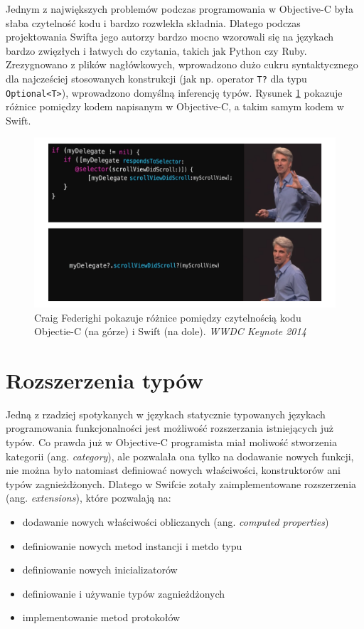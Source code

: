 \documentclass[mgr, shortabstract]{iithesis}
\newcommand{\ang}[1]{ang. \textit{#1}}
\begin{document}
Jednym z największych problemów podczas programowania w Objective-C była słaba czytelność kodu i bardzo rozwlekła składnia. Dlatego podczas projektowania Swifta jego autorzy bardzo mocno wzorowali się na językach bardzo zwięzłych i łatwych do czytania, takich jak Python czy Ruby. Zrezygnowano z plików nagłówkowych, wprowadzono dużo cukru syntaktycznego dla najcześciej stosowanych konstrukcji (jak np. operator \texttt{T?} dla typu \texttt{Optional<T>}), wprowadzono domyślną inferencję typów. Rysunek \ref{f:keynote} pokazuje różnice pomiędzy kodem napisanym w Objective-C, a takim samym kodem w Swift.

\begin{figure}[h!]
\includegraphics[width=\textwidth]{images/Keynote.png}
\caption{Craig Federighi pokazuje różnice pomiędzy czytelnością kodu Objectie-C (na górze) i Swift (na dole). \textit{WWDC Keynote 2014}}
\label{f:keynote}
\end{figure}

\section{Rozszerzenia typów}

Jedną z rzadziej spotykanych w językach statycznie typowanych językach programowania funkcjonalności jest możliwość rozszerzania istniejących już typów. Co prawda już w Objective-C programista miał moliwość stworzenia kategorii (\ang{category}), ale pozwalała ona tylko na dodawanie nowych funkcji, nie można było natomiast definiować nowych właściwości, konstruktorów ani typów zagnieżdżonych. Dlatego w Swifcie zotały zaimplementowane rozszerzenia (\ang{extensions}), które pozwalają na:

\begin{itemize}
    \item dodawanie nowych właściwości obliczanych (\ang{computed properties})
    \item definiowanie nowych metod instancji i metdo typu
    \item definiowanie nowych inicializatorów
    \item definiowanie i używanie typów zagnieżdżonych
    \item implementowanie metod protokołów
\end{itemize}
\end{document}

